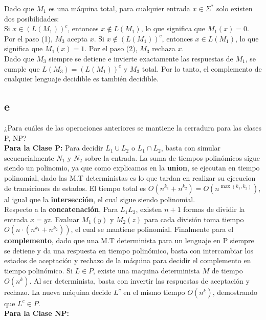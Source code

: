 Dado que $M_1$ es una máquina total, para cualquier entrada $x \in \Sigma^*$ solo existen dos posibilidades:\\

Si $x \in (L(M_1))^c$, entonces $x \notin L(M_1)$, lo que significa que $M_1(x) = 0$. Por el paso (1), $M_3$ acepta $x$. Si $x \notin (L(M_1))^c$, entonces $x \in L(M_1)$, lo que significa que $M_1(x) = 1$. Por el paso (2), $M_3$ rechaza $x$.\\

Dado que $M_3$ siempre se detiene e invierte exactamente las respuestas de $M_1$, se cumple que $L(M_3) = (L(M_1))^c$ y $M_3$ total. Por lo tanto, el complemento de cualquier lenguaje decidible es también decidible.

\subsection*{e}¿Para cuáles de las operaciones anteriores se mantiene la cerradura para las clases P, NP?\\

\textbf{Para la Clase P:} Para decidir $L_1 \cup L_2$ o $L_1 \cap L_2$, basta con simular secuencialmente $N_1$ y $N_2$ sobre la entrada. La suma de tiempos polinómicos sigue siendo un polinomio, ya que como explicamos en la \textbf{union}, se ejecutan en tiempo polinomial, dado las M.T deterministas es lo que tardan en realizar su ejecucion de transiciones de estados. El tiempo total es $O(n^{k_1} + n^{k_2}) = O(n^{\max(k_1, k_2)})$, al igual que la \textbf{intersección}, el cual sigue siendo polinomial.\\

Respecto a la \textbf{concatenación},  Para $L_1 L_2$, existen $n+1$ formas de dividir la entrada $x = yz$. Evaluar $M_1(y)$ y $M_2(z)$ para cada división toma tiempo $O(n \cdot (n^{k_1} + n^{k_2}))$, el cual se mantiene polinomial. Finalmente para el \textbf{complemento}, dado que una M.T determinista para un lenguaje en P siempre se detiene y da una respuesta en tiempo polinómico, basta con intercambiar los estados de aceptación y rechazo de la máquina para decidir el complemento en tiempo polinómico. Si $L \in P$, existe una maquina determinista $M$ de tiempo $O(n^k)$. Al ser determinista, basta con invertir las respuestas de aceptación y rechazo. La nueva máquina decide $L^c$ en el mismo tiempo $O(n^k)$, demostrando que $L^c \in P$.\cite{chowdhary2025theory}\\

\textbf{Para la Clase NP:}

